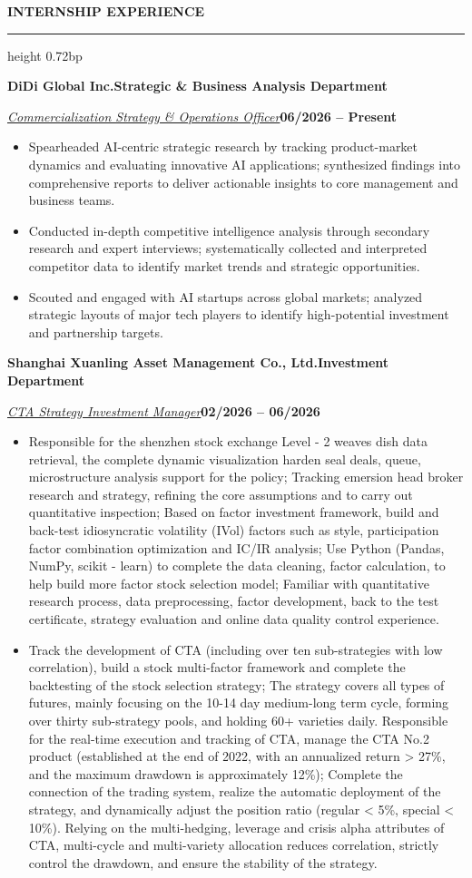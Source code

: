 \documentclass[10pt,a4paper]{article}
\newcommand{\sectionrule}[1]{%
  \par\vspace{3.36bp}\noindent\textbf{#1}\par\vspace{2.62bp}%
  \hrule height 0.72bp\vspace{2.34bp}%
}
\newcommand{\jobcompany}[2]{\par\vspace{1.92bp}\noindent\textbf{#1}\hfill\textbf{#2}\par\vspace{1.44bp}}
\newcommand{\roleline}[2]{\par\noindent\uline{\textit{#1}}\hfill\textbf{#2}\par}
\newenvironment{cvitems}{%
  \begin{itemize}[leftmargin=14.20bp,labelwidth=4.20bp,labelsep=10.00bp,align=left,
    topsep=0bp,itemsep=0bp,parsep=0bp,partopsep=0bp,label={\textbullet}]
}{\end{itemize}}
\begin{document}
\vspace{-1.35bp}\sectionrule{INTERNSHIP EXPERIENCE}
\jobcompany{DiDi Global Inc.}{Strategic \& Business Analysis Department}
\roleline{Commercialization Strategy \& Operations Officer}{06/2026 -- Present}
\begin{cvitems}
\item Spearheaded AI-centric strategic research by tracking product-market dynamics and evaluating innovative AI applications; synthesized findings into comprehensive reports to deliver actionable insights to core management and business teams.
\item Conducted in-depth competitive intelligence analysis through secondary research and expert interviews; systematically collected and interpreted competitor data to identify market trends and strategic opportunities.
\item Scouted and engaged with AI startups across global markets; analyzed strategic layouts of major tech players to identify high-potential investment and partnership targets.
\end{cvitems}

\jobcompany{Shanghai Xuanling Asset Management Co., Ltd.}{Investment Department}
\roleline{CTA Strategy Investment Manager}{02/2026 -- 06/2026}
\begin{cvitems}
\item Responsible for the shenzhen stock exchange Level - 2 weaves dish data retrieval, the complete dynamic visualization harden seal deals, queue, microstructure analysis support for the policy; Tracking emersion head broker research and strategy, refining the core assumptions and to carry out quantitative inspection; Based on factor investment framework, build and back-test idiosyncratic volatility (IVol) factors such as style, participation factor combination optimization and IC/IR analysis; Use Python (Pandas, NumPy, scikit - learn) to complete the data cleaning, factor calculation, to help build more factor stock selection model; Familiar with quantitative research process, data preprocessing, factor development, back to the test certificate, strategy evaluation and online data quality control experience.
\item Track the development of CTA (including over ten sub-strategies with low correlation), build a stock multi-factor framework and complete the backtesting of the stock selection strategy; The strategy covers all types of futures, mainly focusing on the 10-14 day medium-long term cycle, forming over thirty sub-strategy pools, and holding 60+ varieties daily. Responsible for the real-time execution and tracking of CTA, manage the CTA No.2 product (established at the end of 2022, with an annualized return \textgreater{} 27\%, and the maximum drawdown is approximately 12\%); Complete the connection of the trading system, realize the automatic deployment of the strategy, and dynamically adjust the position ratio (regular \textless{} 5\%, special \textless{} 10\%). Relying on the multi-hedging, leverage and crisis alpha attributes of CTA, multi-cycle and multi-variety allocation reduces correlation, strictly control the drawdown, and ensure the stability of the strategy.
\end{cvitems}
\end{document}
